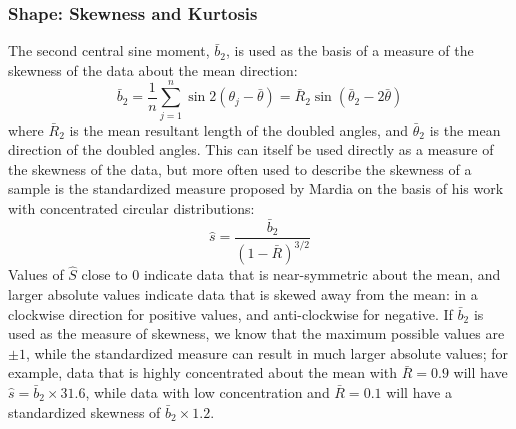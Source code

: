 \documentclass[../../ArchStats.tex]{subfiles}
\begin{document}
 



\subsubsection{Shape: Skewness and Kurtosis}
\label{sec:shape}


The second central sine moment, $\bar{b}_2$, is used as the basis of a measure of the skewness of the data about the mean direction:
\[ \bar{b}_2 = \frac{1}{n} \sum_{j=1}^n \sin 2(\theta_j-\bar{\theta}) = \bar{R}_2 \sin(\bar{\theta}_2 - 2\bar{\theta}) \]
where $\bar{R}_2$ is the mean resultant length of the doubled angles, and $\bar{\theta}_2$ is the mean direction of the doubled angles. This can itself be used directly as a measure of the skewness of the data, but more often used to describe the skewness of a sample is the standardized measure proposed by Mardia \cite{Mardia1972} on the basis of his work with concentrated circular distributions:
\[\hat{s} = \frac{\bar{b}_2}{(1-\bar{R})^{3/2}}\]
Values of $\hat{S}$ close to 0 indicate data that is near-symmetric about the mean, and larger  absolute values indicate data that is skewed away from the mean: in a clockwise direction for positive values, and anti-clockwise for negative. If $\bar{b}_2$ is used as the measure of skewness, we know that the maximum possible values are $\pm 1$, while the standardized measure can result in much larger absolute values; for example, data that is highly concentrated about the mean with $\bar{R} = 0.9$ will have $\hat{s} = \bar{b}_2 \times 31.6$, while data with low concentration and $\bar{R} = 0.1$ will have a standardized skewness of $\bar{b}_2 \times 1.2$.
\end{document}
